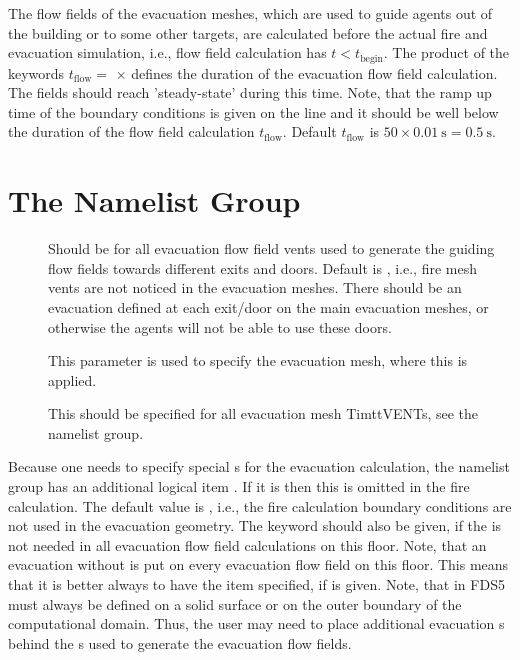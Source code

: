\documentclass[12pt,a4paper,final,twoside]{stylevk}
\begin{document}
The flow fields of the evacuation meshes, which are used to guide
agents out of the building or to some other targets, are calculated
before the actual fire and evacuation simulation, i.e., flow
field calculation has $ t < t_\textrm{begin}$.  The product of the
keywords $t_\mathrm{flow}=$  $\times$
 defines the duration of the evacuation
flow field calculation.  The fields should reach 'steady-state' during
this time.  Note, that the ramp up time of the boundary conditions
 is given on the  line
and it should be well below the duration of the flow field calculation
$t_\mathrm{flow}$.  Default $t_\mathrm{flow}$ is $50\times
0.01~\mathrm{s} = 0.5~\mathrm{s}$.


\section{The  Namelist Group}\label{Sec_VentNML}

\begin{description}
%
\item[] Should be  for all evacuation
  flow field vents used to generate the guiding flow fields towards
  different exits and doors.  Default is , i.e.,
  fire mesh vents are not noticed in the evacuation meshes.  There
  should be an evacuation  defined at each exit/door on
  the main evacuation meshes, or otherwise the agents will not be able
  to use these doors.
%
\item[] This parameter is used to specify the
  evacuation mesh, where this  is applied.

\item[] This should be specified for all
  evacuation mesh Timtt{VENT}s, see the  namelist group.
%
\end{description}

Because one needs to specify special s for the evacuation
calculation, the  namelist group has an additional logical
item .  If it is  then this
 is omitted in the fire calculation.  The default value is
, i.e., the fire calculation boundary conditions
are not used in the evacuation geometry.  The keyword 
should also be given, if the  is not needed in all
evacuation flow field calculations on this floor.  Note, that an
evacuation  without  is put on every
evacuation flow field on this floor.  This means that it is better
always to have the item  specified, if
 is given.  Note, that in FDS5 
must always be defined on a solid surface or on the outer boundary of
the computational domain.  Thus, the user may need to place additional
evacuation s behind the s used to generate the
evacuation flow fields.
\end{document}
